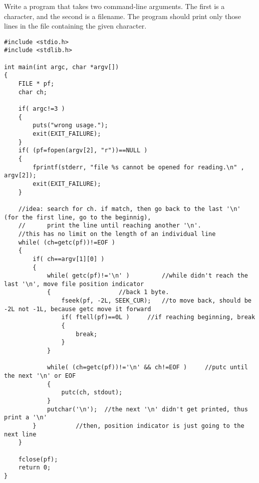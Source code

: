 \begin{question}
Write a program that takes two command-line arguments. The first is a character, and
the second is a filename. The program should print only those lines in the file containing
the given character.
\end{question}
\begin{solution}
  \begin{verbatim}
#include <stdio.h>
#include <stdlib.h>

int main(int argc, char *argv[])
{
	FILE * pf;
	char ch;

	if( argc!=3 )
	{
		puts("wrong usage.");
		exit(EXIT_FAILURE);
	}
	if( (pf=fopen(argv[2], "r"))==NULL )
	{
		fprintf(stderr, "file %s cannot be opened for reading.\n" , argv[2]);
		exit(EXIT_FAILURE);
	}

	//idea: search for ch. if match, then go back to the last '\n' (for the first line, go to the beginnig),
	//      print the line until reaching another '\n'.
	//this has no limit on the length of an individual line
	while( (ch=getc(pf))!=EOF )
	{
		if( ch==argv[1][0] )
		{
			while( getc(pf)!='\n' )		    //while didn't reach the last '\n', move file position indicator
			{				    //back 1 byte.
				fseek(pf, -2L, SEEK_CUR);   //to move back, should be -2L not -1L, because getc move it forward
				if( ftell(pf)==0L )	    //if reaching beginning, break
				{
					break;
				}
			}

			while( (ch=getc(pf))!='\n' && ch!=EOF )		//putc until the next '\n' or EOF
			{
				putc(ch, stdout);
			}
			putchar('\n');	//the next '\n' didn't get printed, thus print a '\n'
		}			//then, position indicator is just going to the next line
	}

	fclose(pf);
	return 0;
}
  \end{verbatim}
\end{solution}

